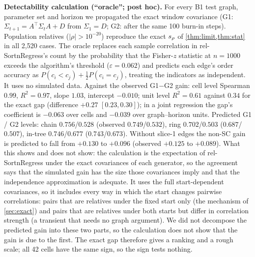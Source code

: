 \textbf{Detectability calculation (``oracle''; post hoc).} For every B1 test graph, parameter set
and horizon we propagated the exact window covariance (G1:
$\Sigma_{t+1}=A^\top\Sigma_tA+D$ from $\Sigma_1=D$; G2: after the same 100
burn-in steps). Population relatives ($|\rho|>10^{-20}$) reproduce the exact
$s_\rho$ of \cref{thm:limit,thm:stat} in all 2{,}520 cases. The oracle replaces
each sample correlation in rel-SortnRegress's count by the probability that
the Fisher-$z$ statistic at $n=1000$ exceeds the algorithm's threshold
($\varepsilon=0.062$) and predicts each edge's order accuracy as
$P(c_i<c_j)+\tfrac12P(c_i=c_j)$, treating the indicators as independent. It uses
no simulated data. Against the observed G1$-$G2 gain: cell level Spearman
$0.99$, $R^2=0.97$, slope $1.03$, intercept $-0.010$; unit level $R^2=0.61$
against $0.34$ for the exact gap (difference $+0.27$ $[0.23,0.30]$); in a joint
regression the gap's coefficient is $-0.063$ over cells and $-0.039$ over graph--horizon units. Predicted G1 / G2 levels: chain
$0.756$/$0.528$ (observed $0.749$/$0.532$), ring $0.702$/$0.503$ ($0.687$/$0.507$),
in-tree $0.746$/$0.677$ ($0.743$/$0.673$). Without slice-1 edges the non-SC gain
is predicted to fall from $+0.130$ to $+0.096$ (observed $+0.125$ to $+0.089$).
What this shows and does not show: the calculation is the expectation of
rel-SortnRegress under the exact covariances of each generator, so the
agreement says that the simulated gain has the size those covariances imply
and that the independence approximation is adequate. It uses the full
start-dependent covariances, so it includes every way in which the start
changes pairwise correlations: pairs that are relatives under the fixed start
only (the mechanism of \cref{sec:exact}) and pairs that are relatives under
both starts but differ in correlation strength (a transient that needs no
graph argument). We did not decompose the predicted gain into these two
parts, so the calculation does not show that the gain is due to the first.
The exact gap therefore gives a ranking and a rough scale; all 42 cells have the same sign, so the sign tests nothing.

